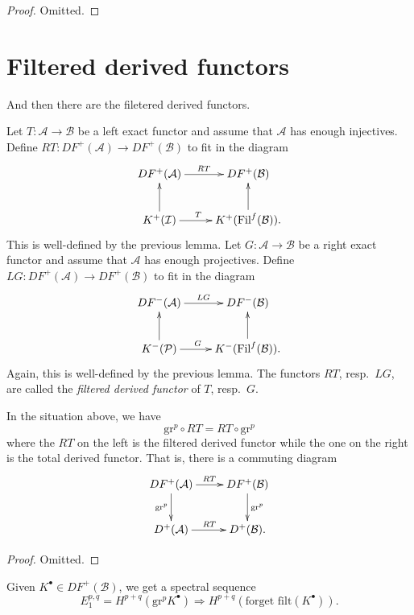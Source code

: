 \begin{proof}
Omitted.
\end{proof}





\section{Filtered derived functors}
\label{section-filtered-derived-functors}

\noindent
And then there are the filetered derived functors.

\begin{definition}
\label{definition-filtered-derived-functors}
Let $T: \mathcal{A} \to \mathcal{B}$ be a left exact functor and assume that
$\mathcal{A}$ has enough injectives. Define $RT: D F^+(\mathcal{A}) \to D
F^+(\mathcal{B})$ to fit in the diagram
$$
\xymatrix{
D F^+(\mathcal{A}) \ar^{RT}[r] & D F^+(\mathcal{B}) \\
K^+(\mathcal{I}) \ar[u] \ar[r]^{T \quad} & K^+(\text{Fil}^f(\mathcal{B})).
\ar[u]}
$$
This is well-defined by the previous lemma. Let $G: \mathcal{A} \to
\mathcal{B}$ be a right exact functor and assume that $\mathcal{A}$ has enough
projectives. Define $LG: D F^+(\mathcal{A}) \to D F^+(\mathcal{B})$ to fit in
the diagram
$$
\xymatrix{
D F^-(\mathcal{A}) \ar^{LG}[r] & D F^-(\mathcal{B}) \\
K^-(\mathcal{P}) \ar[u] \ar[r]^{G \quad} & K^-(\text{Fil}^f(\mathcal{B})).
\ar[u]}
$$
Again, this is well-defined by the previous lemma.
The functors $RT$, resp.\ $LG$, are called the {\it filtered derived
functor} of $T$, resp.\ $G$.
\end{definition}

\begin{proposition}
\label{proposition-compare-filtered-graded}
In the situation above, we have
$$
\mathrm{gr}^p \circ RT = RT \circ \mathrm{gr}^p
$$
where the $RT$ on the left is the filtered derived functor while the one on the
right is the total derived functor. That is, there is a commuting diagram
$$
\xymatrix{
D F^+(\mathcal{A}) \ar[r]^{RT} \ar[d]_{\text{gr}^p} & D F^+(\mathcal{B})
\ar[d]^{\text{gr}^p}\\
D^+(\mathcal{A}) \ar[r]^{RT} & D^+(\mathcal{B}).}
$$
\end{proposition}

\begin{proof}
Omitted.
\end{proof}

\noindent
Given $K^\bullet \in D F^+(\mathcal{B})$, we get a spectral sequence
$$
E_1^{p,q} = H^{p+q}(\text{gr}^p K^\bullet) \Rightarrow H^{p+q}(\text{forget
filt}(K^\bullet)).
$$







